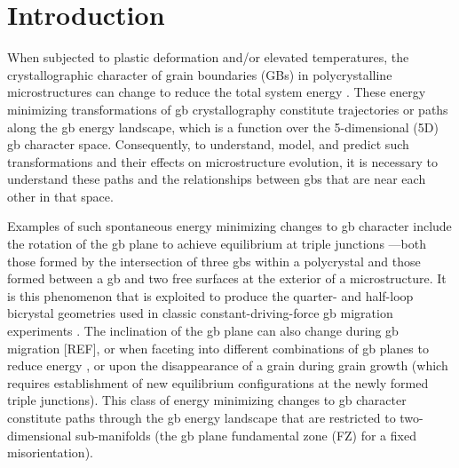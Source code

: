 \documentclass[final,twocolumn,12pt]{elsarticle}
\begin{document}
	
	\section{Introduction} \label{sec:intro}
	
	When subjected to plastic deformation and/or elevated temperatures, the crystallographic character of grain boundaries (GBs) in polycrystalline microstructures can change to reduce the total system energy \cite{bachurinGrainRotationDislocation2012,barrales-moraImpactGrainBoundary2014,harrisGRAINROTATIONTHIN,klingerShapeEvolutionSurface2011,upmanyuSimultaneousGrainBoundary2006a}. These energy minimizing transformations of \gls{gb} crystallography constitute trajectories or paths along the \gls{gb} energy landscape, which is a function over the 5-dimensional (5D) \gls{gb} character space. Consequently, to understand, model, and predict such transformations and their effects on microstructure evolution, it is necessary to understand these paths and the relationships between \glspl{gb} that are near each other in that space.
	
	Examples of such spontaneous energy minimizing changes to \gls{gb} character include the rotation of the \gls{gb} plane to achieve equilibrium at triple junctions \cite{Herring:1951tm,rowenhorstMeasurementsGrainBoundary2005a}---both those formed by the intersection of three \glspl{gb} within a polycrystal and those formed between a \gls{gb} and two free surfaces at the exterior of a microstructure. It is this phenomenon that is exploited to produce the quarter- and half-loop bicrystal geometries used in classic constant-driving-force \gls{gb} migration experiments \cite{brandenburgEffectInclinationDependence2013,furtkampGrainBoundaryMigration1998,gottsteinGrainBoundaryMigration,ivanovImpactBoundaryOrientation2004,molodovEffectPressureMigration1984,molodovMOBHJTYTILTGRAIN}. The inclination of the \gls{gb} plane can also change during \gls{gb} migration [REF], or when faceting into different combinations of \gls{gb} planes to reduce energy \cite{ramasubramaniamEvolutionFacetedGrainboundary2005}, or upon the disappearance of a grain during grain growth (which requires establishment of new equilibrium configurations at the newly formed triple junctions). This class of energy minimizing changes to \gls{gb} character constitute paths through the \gls{gb} energy landscape that are restricted to two-dimensional sub-manifolds (the \gls{gb} plane fundamental zone (FZ) for a fixed misorientation).
	
\end{document}
